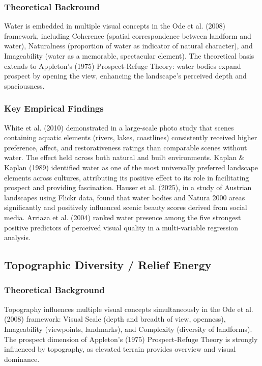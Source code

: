 \documentclass[hidelinks, 11pt]{article}
\begin{document}
\subsubsection{Theoretical Backround}
Water is embedded in multiple visual concepts in the Ode et al. (2008) framework, including Coherence (spatial correspondence between landform and water), Naturalness (proportion of water as indicator of natural character), and Imageability (water as a memorable, spectacular element). The theoretical basis extends to Appleton's (1975) Prospect-Refuge Theory: water bodies expand prospect by opening the view, enhancing the landscape's perceived depth and spaciousness.
\subsubsection{Key Empirical Findings}
White et al. (2010) demonstrated in a large-scale photo study that scenes containing aquatic elements (rivers, lakes, coastlines) consistently received higher preference, affect, and restorativeness ratings than comparable scenes without water. The effect held across both natural and built environments. Kaplan & Kaplan (1989) identified water as one of the most universally preferred landscape elements across cultures, attributing its positive effect to its role in facilitating prospect and providing fascination. Hauser et al. (2025), in a study of Austrian landscapes using Flickr data, found that water bodies and Natura 2000 areas significantly and positively influenced scenic beauty scores derived from social media. Arriaza et al. (2004) ranked water presence among the five strongest positive predictors of perceived visual quality in a multi-variable regression analysis.

\subsection{Topographic Diversity / Relief Energy}\label{sec:TDRE}
\subsubsection{Theoretical Background}
Topography influences multiple visual concepts simultaneously in the Ode et al. (2008) framework: Visual Scale (depth and breadth of view, openness), Imageability (viewpoints, landmarks), and Complexity (diversity of landforms). The prospect dimension of Appleton's (1975) Prospect-Refuge Theory is strongly influenced by topography, as elevated terrain provides overview and visual dominance.
\end{document}
